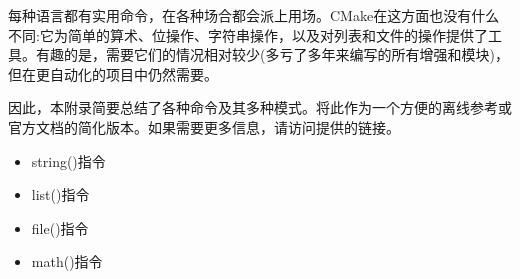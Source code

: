 每种语言都有实用命令，在各种场合都会派上用场。CMake在这方面也没有什么不同:它为简单的算术、位操作、字符串操作，以及对列表和文件的操作提供了工具。有趣的是，需要它们的情况相对较少(多亏了多年来编写的所有增强和模块)，但在更自动化的项目中仍然需要。

因此，本附录简要总结了各种命令及其多种模式。将此作为一个方便的离线参考或官方文档的简化版本。如果需要更多信息，请访问提供的链接。

\begin{itemize}
\item 
string()指令

\item 
list()指令

\item 
file()指令

\item 
math()指令
\end{itemize}



















